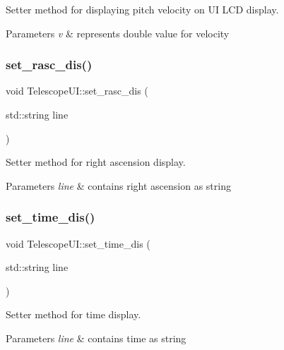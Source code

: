 Setter method for displaying pitch velocity on UI \textquotesingle{}L\+CD display\textquotesingle{}. 


\begin{DoxyParams}{Parameters}
{\em v} & represents double value for velocity \\
\hline
\end{DoxyParams}
\mbox{\label{classTelescopeUI_a9af61f40fd39d3c22ecd349a038ef2b5}} 
\subsubsection{\texorpdfstring{set\+\_\+rasc\+\_\+dis()}{set\_rasc\_dis()}}
{\footnotesize\ttfamily void Telescope\+U\+I\+::set\+\_\+rasc\+\_\+dis (\begin{DoxyParamCaption}\item[{std\+::string}]{line }\end{DoxyParamCaption})}



Setter method for right ascension display. 


\begin{DoxyParams}{Parameters}
{\em line} & contains right ascension as string \\
\hline
\end{DoxyParams}
\mbox{\label{classTelescopeUI_aa4bddc57881d00dd145312c84467ac1d}} 
\subsubsection{\texorpdfstring{set\+\_\+time\+\_\+dis()}{set\_time\_dis()}}
{\footnotesize\ttfamily void Telescope\+U\+I\+::set\+\_\+time\+\_\+dis (\begin{DoxyParamCaption}\item[{std\+::string}]{line }\end{DoxyParamCaption})}



Setter method for time display. 


\begin{DoxyParams}{Parameters}
{\em line} & contains time as string \\
\hline
\end{DoxyParams}
\mbox{\label{classTelescopeUI_ac228bd23c7e759df5aa81206872214b5}} 
